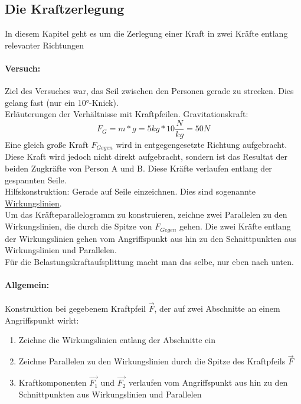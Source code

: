 	\subsection{Die Kraftzerlegung}
	In diesem Kapitel geht es um die Zerlegung einer Kraft in zwei Kräfte entlang relevanter Richtungen
	\paragraph{Versuch:}
	Ziel des Versuches war, das Seil zwischen den Personen gerade zu strecken. Dies gelang fast (nur ein 10°-Knick).\\
	Erläuterungen der Verhältnisse mit Kraftpfeilen. Gravitationskraft:
	\begin{equation}
		F_G=m*g=5kg*10\dfrac{N}{kg}=50N
	\end{equation}
	Eine gleich große Kraft $ F_{Gegen} $ wird in entgegengesetzte Richtung aufgebracht. Diese Kraft wird jedoch nicht direkt aufgebracht, sondern ist das Resultat der beiden Zugkräfte von Person A und B. Diese Kräfte verlaufen entlang der gespannten Seile.\\
	Hilfskonstruktion: Gerade auf Seile einzeichnen. Dies sind sogenannte \underline{Wirkungslinien}.\\
	Um das Kräfteparallelogramm zu konstruieren, zeichne zwei Parallelen zu den Wirkungslinien, die durch die Spitze von $ F_{Gegen} $ gehen. Die zwei Kräfte entlang der Wirkungslinien gehen vom Angriffspunkt aus hin zu den Schnittpunkten aus Wirkungslinien und Parallelen.\\
	Für die Belastungskraftaufsplittung macht man das selbe, nur eben nach unten.
	
	\paragraph{Allgemein:}
	Konstruktion bei gegebenem Kraftpfeil $ \vec{F} $, der auf zwei Abschnitte an einem Angriffspunkt wirkt:
	\begin{enumerate}
		\item Zeichne die Wirkungslinien entlang der Abschnitte ein
		\item Zeichne Parallelen zu den Wirkungslinien durch die Spitze des Kraftpfeils $ \vec{F} $
		\item Kraftkomponenten $ \vec{F_1} $ und $ \vec{F_2} $ verlaufen vom Angriffspunkt aus hin zu den Schnittpunkten aus Wirkungslinien und Parallelen
	\end{enumerate}
